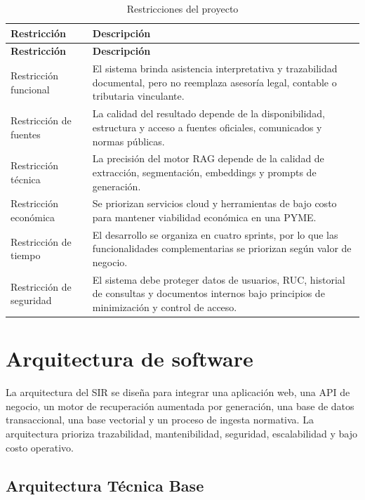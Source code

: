 \documentclass[12pt,a4paper,oneside]{report}
\begin{document}
\begin{longtable}{p{}p{}}
\caption{Restricciones del proyecto}\label{tab:cap3-restricciones}\\
\toprule
\textbf{Restricción} & \textbf{Descripción} \\
\midrule
\endfirsthead
\toprule
\textbf{Restricción} & \textbf{Descripción} \\
\midrule
\endhead
Restricción funcional & El sistema brinda asistencia interpretativa y trazabilidad documental, pero no reemplaza asesoría legal, contable o tributaria vinculante. \\
Restricción de fuentes & La calidad del resultado depende de la disponibilidad, estructura y acceso a fuentes oficiales, comunicados y normas públicas. \\
Restricción técnica & La precisión del motor RAG depende de la calidad de extracción, segmentación, embeddings y prompts de generación. \\
Restricción económica & Se priorizan servicios cloud y herramientas de bajo costo para mantener viabilidad económica en una PYME. \\
Restricción de tiempo & El desarrollo se organiza en cuatro sprints, por lo que las funcionalidades complementarias se priorizan según valor de negocio. \\
Restricción de seguridad & El sistema debe proteger datos de usuarios, RUC, historial de consultas y documentos internos bajo principios de minimización y control de acceso. \\
\bottomrule
\end{longtable}

\section{Arquitectura de software}\label{sec:arquitectura-de-software}

La arquitectura del SIR se diseña para integrar una aplicación web, una API de negocio, un motor de recuperación aumentada por generación, una base de datos transaccional, una base vectorial y un proceso de ingesta normativa. La arquitectura prioriza trazabilidad, mantenibilidad, seguridad, escalabilidad y bajo costo operativo.

\subsection{Arquitectura Técnica Base}\label{subsec:arquitectura-tecnica-base}
\end{document}
